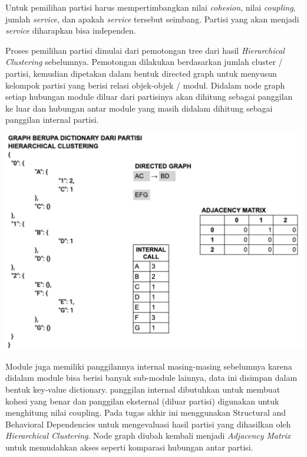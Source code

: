 Untuk pemilihan partisi harus mempertimbangkan nilai \textit{cohesion}, nilai \textit{coupling}, jumlah \textit{service}, dan apakah \textit{service} tersebut seimbang. Partisi yang akan menjadi \textit{service} diharapkan bisa independen. 

Proses pemilihan partisi dimulai dari pemotongan tree dari hasil \textit{Hierarchical Clustering} sebelumnya. Pemotongan dilakukan berdasarkan jumlah cluster / partisi, kemudian  dipetakan dalam bentuk directed graph untuk menyusun kelompok partisi yang berisi relasi objek-objek / modul. Didalam node graph setiap hubungan module diluar dari partisinya akan dihitung sebagai panggilan ke luar dan hubungan antar module yang masih didalam  dihitung sebagai panggilan internal partisi.

\begin{center}
	\includegraphics[width=14cm]{img/bab_3/eval_detail1.png}
	\label{fig:asd}
\end{center}

Module juga memiliki panggilannya internal masing-masing sebelumnya karena didalam module bisa berisi banyak sub-module lainnya, data ini disimpan dalam bentuk key-value dictionary. panggilan internal dibutuhkan untuk membuat kohesi yang benar dan panggilan eksternal (diluar partisi) digunakan untuk menghitung nilai coupling.  Pada tugas akhir ini menggunakan Structural and Behavioral Dependencies untuk mengevaluasi hasil partisi yang dihasilkan oleh \textit{Hierarchical Clustering}. Node graph diubah kembali menjadi \textit{Adjacency} \textit{Matrix} untuk memudahkan akses seperti komparasi hubungan antar partisi. 


